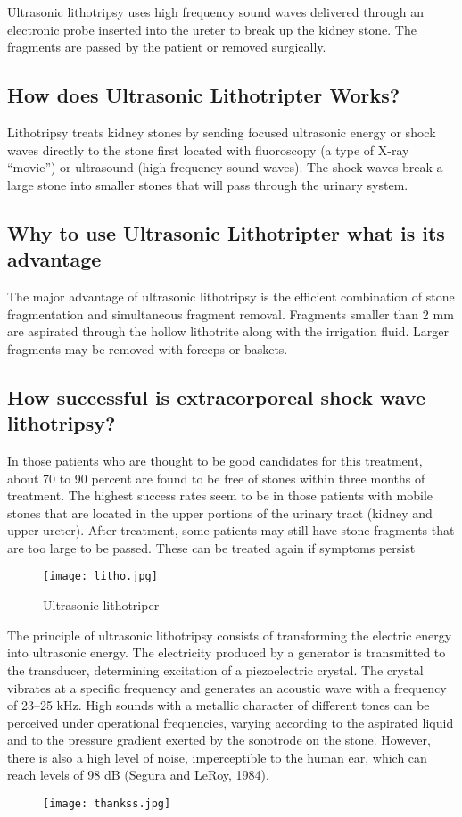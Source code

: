 \documentclass[12pt]{report}
\begin{document}
Ultrasonic lithotripsy uses high frequency sound waves delivered through an electronic probe inserted into the ureter to break up the kidney stone. The fragments are passed by the patient or removed surgically.\

\subsection{How does Ultrasonic Lithotripter Works?}
Lithotripsy treats kidney stones by sending focused ultrasonic energy or shock waves directly to the stone first located with fluoroscopy (a type of X-ray “movie”) or ultrasound (high frequency sound waves). The shock waves break a large stone into smaller stones that will pass through the urinary system.

\subsection{Why to use Ultrasonic Lithotripter what is its advantage}
The major advantage of ultrasonic lithotripsy is the efficient combination of stone fragmentation and simultaneous fragment removal. Fragments smaller than 2 mm are aspirated through the hollow lithotrite along with the irrigation fluid. Larger fragments may be removed with forceps or baskets.

\subsection{How successful is extracorporeal shock wave lithotripsy?}
In those patients who are thought to be good candidates for this treatment, about 70 to 90 percent are found to be free of stones within three months of treatment. The highest success rates seem to be in those patients with mobile stones that are located in the upper portions of the urinary tract (kidney and upper ureter). After treatment, some patients may still have stone fragments that are too large to be passed. These can be treated again if symptoms persist

\begin{figure}[h]
\centering
\texttt{[image: litho.jpg]}
\caption{Ultrasonic lithotriper}
\end{figure}

The principle of ultrasonic lithotripsy consists of transforming the electric energy into ultrasonic energy. The electricity produced by a generator  is transmitted to the transducer, determining excitation of a piezoelectric crystal. The crystal vibrates at a specific frequency and generates an acoustic wave with a frequency of 23–25 kHz. High sounds with a metallic character of different tones can be perceived under operational frequencies, varying according to the aspirated liquid and to the pressure gradient exerted by the sonotrode on the stone. However, there is also a high level of noise, imperceptible to the human ear, which can reach levels of 98 dB (Segura and LeRoy, 1984).
\clearpage

\begin{figure}
\centering
\texttt{[image: thankss.jpg]}
\end{figure}
\end{document}
